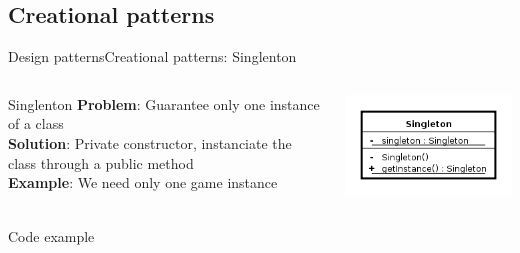 \documentclass[10pt,compress]{beamer} %
\begin{document}
\subsection[Creational patterns]{Creational patterns}
\begin{frame}[plain]{Design patterns}{Creational patterns: Singlenton}
    \begin{columns}
	   \begin{block}{Singlenton}
			\textbf{Problem}: Guarantee only one instance of a class\\
			\textbf{Solution}: Private constructor, instanciate the class through a public method\\
			\textbf{Example}: We need only one game instance\\
		\end{block}
			\centering\includegraphics[width=\linewidth]{figs/singlenton}\\
\end{columns}
    \begin{block}{Code example}
	    \vspace{-0.2cm}
	    
		\vspace{-0.2cm}
	\end{block}
\end{frame}
\end{document}
